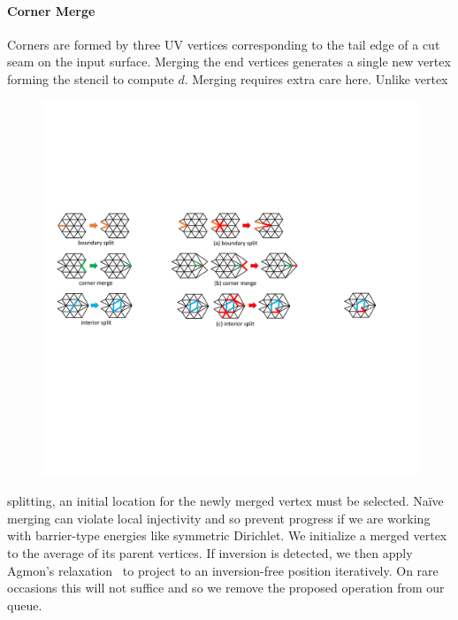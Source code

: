 \paragraph{Corner Merge}
Corners are formed by three UV vertices corresponding to the tail edge of a cut seam on the input surface. 
%
Merging the end vertices generates a single new vertex forming the stencil to compute $d$. Merging requires extra care here. Unlike vertex 
%
\begin{figure}
  \begin{center}
  \vspace{-5mm}
    \includegraphics[width=1\linewidth]{fig/cMerge.pdf}
  \vspace{-4mm}
  \end{center}
\end{figure}
%
splitting, an initial location for the newly merged vertex must be selected. Na\"ive merging can violate local injectivity and so prevent progress if we are working with barrier-type energies like symmetric Dirichlet. We initialize a merged vertex to the average of its parent vertices. If inversion is detected, we then apply Agmon's relaxation~ to project to an inversion-free position iteratively. On rare occasions this will not suffice and so we remove the proposed operation from our queue.

